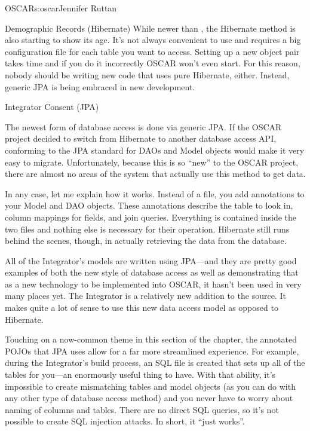 \begin{aosachapter}{OSCAR}{s:oscar}{Jennifer Ruttan}
\begin{aosasect2}{Demographic Records (Hibernate)}
While newer than , the Hibernate method is also
starting to show its age. It's not always convenient to use and
requires a big configuration file for each table you want to
access. Setting up a new object pair takes time and if you do it
incorrectly OSCAR won't even start. For this reason, nobody should be
writing new code that uses pure Hibernate, either. Instead, generic
JPA is being embraced in new development.

\end{aosasect2}

\begin{aosasect2}{Integrator Consent (JPA)}

The newest form of database access is done via generic JPA. If the
OSCAR project decided to switch from Hibernate to another database
access API, conforming to the JPA standard for DAOs and Model objects
would make it very easy to migrate. Unfortunately, because this is so
``new'' to the OSCAR project, there are almost no areas of the system
that actually use this method to get data.

In any case, let me explain how it works. Instead of a 
file, you add annotations to your Model and DAO objects. These
annotations describe the table to look in, column mappings for fields,
and join queries. Everything is contained inside the two files and
nothing else is necessary for their operation. Hibernate still runs
behind the scenes, though, in actually retrieving the data from the
database.

All of the Integrator's models are written using JPA---and they are
pretty good examples of both the new style of database access as well
as demonstrating that as a new technology to be implemented into
OSCAR, it hasn't been used in very many places yet. The Integrator is
a relatively new addition to the source. It makes quite a lot of sense
to use this new data access model as opposed to Hibernate.

Touching on a now-common theme in this section of the chapter, the
annotated POJOs that JPA uses allow for a far more streamlined
experience. For example, during the Integrator's build process, an SQL
file is created that sets up all of the tables for you---an enormously
useful thing to have. With that ability, it's impossible to create
mismatching tables and model objects (as you can do with any other
type of database access method) and you never have to worry about
naming of columns and tables. There are no direct SQL queries, so it's
not possible to create SQL injection attacks. In short, it ``just
works''.


\end{aosasect2}
\end{aosachapter}
